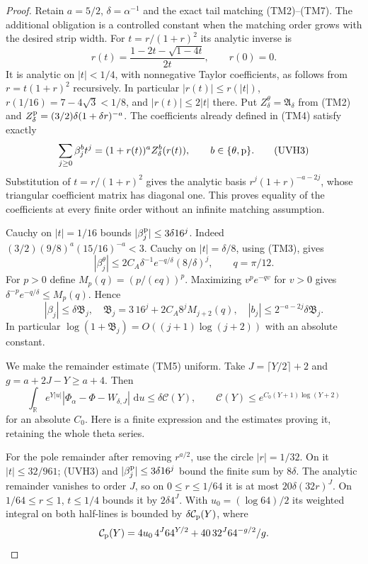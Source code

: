 \documentclass[11pt]{article}
\theoremstyle{remark}\newtheorem{remark}[theorem]{Remark}
\newcommand{\R}{\mathbb R}
\newcommand{\dd}{\,\mathrm d}
\begin{document}
\begin{proof}
Retain $a=5/2$, $\delta=\alpha^{-1}$ and the exact tail matching
(TM2)--(TM7). The additional obligation is a controlled constant
when the matching order grows with the desired strip width.
For $t=r/(1+r)^2$ its analytic inverse is
\[
 r(t)=\frac{1-2t-\sqrt{1-4t}}{2t},\qquad r(0)=0 .
\]
It is analytic on $|t|<1/4$, with nonnegative Taylor
coefficients, as follows from $r=t(1+r)^2$ recursively.
In particular $|r(t)|\le r(|t|)$,
$r(1/16)=7-4\sqrt3<1/8$, and $|r(t)|\le2|t|$ there.
Put $Z^\theta_\delta=\mathfrak A_\delta$ from (TM2) and
$Z^{\rm p}_\delta=(3/2)\delta(1+\delta r)^{-a}$.
The coefficients already defined in (TM4) satisfy exactly
\[
 \sum_{j\ge0}\beta_j^b t^j
       =(1+r(t))^a Z^b_\delta(r(t)),
                         \qquad b\in\{\theta,{\rm p}\}.  \tag{UVH3}
\]
Substitution of $t=r/(1+r)^2$ gives the analytic basis
$r^j(1+r)^{-a-2j}$, whose triangular coefficient matrix
has diagonal one. This proves equality of the coefficients
at every finite order without an infinite matching assumption.

Cauchy on $|t|=1/16$ bounds
$|\beta_j^{\rm p}|\le3\delta16^j$.
Indeed $(3/2)(9/8)^a(15/16)^{-a}<3$.
Cauchy on $|t|=\delta/8$, using (TM3), gives
\[
 |\beta_j^\theta|
 \le2C_A\delta^{-1}e^{-q/\delta}(8/\delta)^j,
 \qquad q=\pi/12 .
\]
For $p>0$ define $M_p(q)=(p/(eq))^p$. Maximizing
$v^pe^{-qv}$ for $v>0$ gives
$\delta^{-p}e^{-q/\delta}\le M_p(q)$. Hence
\[
 |\beta_j|\le\delta\mathfrak B_j,\quad
 \mathfrak B_j=3\,16^j+2C_A8^jM_{j+2}(q),\quad
 |b_j|\le2^{-a-2j}\delta\mathfrak B_j .            \tag{UVH4}
\]
In particular $\log(1+\mathfrak B_j)=O((j+1)\log(j+2))$
with an absolute constant.

We make the remainder estimate (TM5) uniform. Take
$J=\lceil Y/2\rceil+2$ and $g=a+2J-Y\ge a+4$.
Then
\[
 \int_\R e^{Y|u|}
       |\Phi_\alpha-\Phi-W_{\delta,J}|\,\dd u
       \le\delta\mathcal C(Y),\qquad
 \mathcal C(Y)\le e^{C_0(Y+1)\log(Y+2)}              \tag{UVH5}
\]
for an absolute $C_0$. Here is a finite expression and the
estimates proving it, retaining the whole theta series.

For the pole remainder after removing $r^{a/2}$, use the
circle $|r|=1/32$. On it $|t|\le32/961$; (UVH3) and
$|\beta_j^{\rm p}|\le3\delta16^j$ bound the finite sum
by $8\delta$. The analytic remainder vanishes to order $J$,
so on $0\le r\le1/64$ it is at most
$20\delta(32r)^J$. On $1/64\le r\le1$,
$t\le1/4$ bounds it by $2\delta4^J$.
With $u_0=(\log64)/2$ its weighted integral on both
half-lines is bounded by $\delta\mathcal C_{\rm p}(Y)$, where
\[
 \mathcal C_{\rm p}(Y)=4u_0\,4^J64^{Y/2}
                   +40\,32^J64^{-g/2}/g .
\]


\end{proof}
\end{document}
